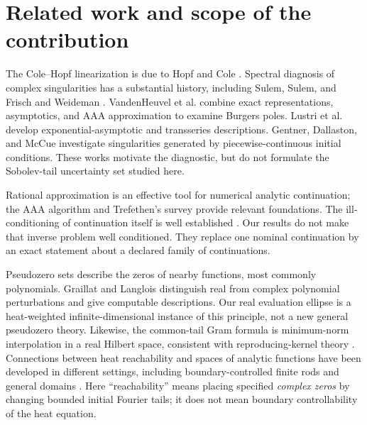 \documentclass[11pt]{article}
\begin{document}
\section{Related work and scope of the contribution}
The Cole--Hopf linearization is due to Hopf and Cole \cite{hopf,cole}. Spectral diagnosis of complex singularities has a substantial history, including Sulem, Sulem, and Frisch \cite{sulem} and Weideman \cite{weideman}. VandenHeuvel et al. \cite{vandenheuvel} combine exact representations, asymptotics, and AAA approximation to examine Burgers poles. Lustri et al. \cite{lustri} develop exponential-asymptotic and transseries descriptions. Gentner, Dallaston, and McCue \cite{gentner} investigate singularities generated by piecewise-continuous initial conditions. These works motivate the diagnostic, but do not formulate the Sobolev-tail uncertainty set studied here.

Rational approximation is an effective tool for numerical analytic continuation; the AAA algorithm \cite{aaa} and Trefethen's survey \cite{continuation} provide relevant foundations. The ill-conditioning of continuation itself is well established \cite{illconditioning}. Our results do not make that inverse problem well conditioned. They replace one nominal continuation by an exact statement about a declared family of continuations.

Pseudozero sets describe the zeros of nearby functions, most commonly polynomials. Graillat and Langlois \cite{pseudozeros} distinguish real from complex polynomial perturbations and give computable descriptions. Our real evaluation ellipse is a heat-weighted infinite-dimensional instance of this principle, not a new general pseudozero theory. Likewise, the common-tail Gram formula is minimum-norm interpolation in a real Hilbert space, consistent with reproducing-kernel theory \cite{aronszajn}. Connections between heat reachability and spaces of analytic functions have been developed in different settings, including boundary-controlled finite rods \cite{lopez} and general domains \cite{strohmaier}. Here ``reachability'' means placing specified \emph{complex zeros} by changing bounded initial Fourier tails; it does not mean boundary controllability of the heat equation.
\end{document}
